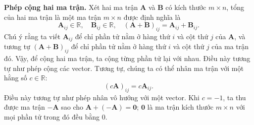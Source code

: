 \textbf{Phép cộng hai ma trận.} Xét hai ma trận \(\mathbf{A}\) và \(\mathbf{B}\) có kích thước \(m\times n\), tổng của hai ma trận là một ma trận \(m\times n\) được định nghĩa là 
\begin{equation}
   \mathbf{A}_{ij}\in\mathbb{R},\quad \mathbf{B}_{ij}\in\mathbb{R},\quad 
    (\mathbf{A}+\mathbf{B})_{ij}=\mathbf{A}_{ij}+\mathbf{B}_{ij}.
\end{equation}
Chú ý rằng ta viết \(\mathbf{A}_{ij}\) để chỉ phần tử nằm ở hàng thứ \(i\) và cột thứ \(j\) của \(\mathbf{A}\), và tương tự \((\mathbf{A+B})_{ij}\) để chỉ phần tử nằm ở hàng thứ \(i\) và cột thứ \(j\) của ma trận đó. Vậy, để cộng hai ma trận, ta cộng từng phần tử lại với nhau. Điều này tương tự như phép cộng các vector.
Tương tự, chúng ta có thể nhân ma trận với một hằng số \(c\in\mathbb{R}\):
\begin{equation}
    (c\mathbf{A})_{ij}=c\mathbf{A}_{ij}.
\end{equation}
Điều này tương tự như phép nhân vô hướng với một vector. Khi \(c=-1\), ta thu được ma trận \(-\mathbf{A}\) sao cho \(\mathbf{A}+(-\mathbf{A})=\mathbf{0}\); \(\mathbf{0}\) là ma trận kích thước \(m\times n\) với mọi phần tử trong đó đều bằng \(0\).
\vspace{8pt}


